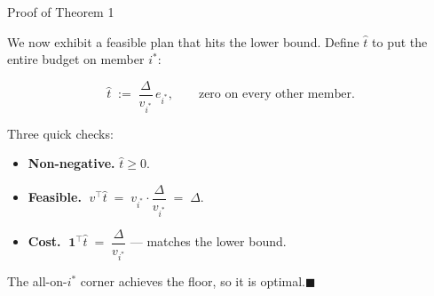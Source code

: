 \documentclass[aspectratio=169]{beamer}
\newcommand{\accentline}{\vspace{1pt}{\color{accent}\rule{0.3\textwidth}{1.5pt}}\vspace{4pt}}
\begin{document}
\begin{frame}{Proof of Theorem 1}
\accentline
\vspace{8pt}

{\small We now exhibit a feasible plan that hits the lower bound. Define $\hat t$ to put the entire budget on member $i^*$:}

\vspace{2pt}
\[
    \hat t \;:=\; \frac{\Delta}{v_{i^*}}\, e_{i^*}, \qquad \text{zero on every other member.}
\]

{\small Three quick checks:}
\vspace{2pt}
\begin{itemize}\setlength{\itemsep}{3pt}
    \item {\small \textbf{Non-negative.} $\hat t \geq 0$. \checkmark}
    \item {\small \textbf{Feasible.} $\;v^\top \hat t \;=\; v_{i^*} \cdot \dfrac{\Delta}{v_{i^*}} \;=\; \Delta$. \checkmark}
    \item {\small \textbf{Cost.} $\;\mathbf{1}^\top \hat t \;=\; \dfrac{\Delta}{v_{i^*}}$ --- matches the lower bound. \checkmark}
\end{itemize}

\vspace{6pt}

{\small\color{midgray} The all-on-$i^*$ corner achieves the floor, so it is optimal.\hfill$\blacksquare$}
\end{frame}
\end{document}
